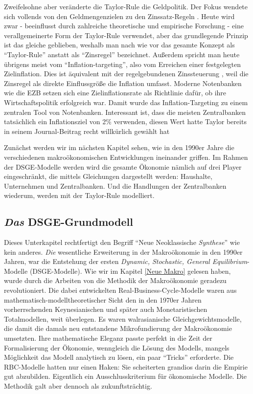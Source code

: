 Zweifelsohne aber veränderte die Taylor-Rule die Geldpolitik. Der Fokus wendete sich vollends von den Geldmengenzielen \parencite{Friedman1960} zu den Zinssatz-Regeln \parencite[S. 36]{Gali2007}. Heute wird zwar - beeinflusst durch zahlreiche theoretische \parencite{Woodford2001} und empirische \parencite{Gali2000, Taylor1999} Forschung - eine verallgemeinerte Form der Taylor-Rule verwendet, aber das grundlegende Prinzip ist das gleiche geblieben, weshalb man nach wie vor das gesamte Konzept als "`Taylor-Rule"' anstatt als "`Zinsregel"' bezeichnet. Außerdem spricht man heute übrigens meist vom "`Inflation-targeting"', also vom Erreichen einer festgelegten Zielinflation. Dies ist äquivalent mit der regelgebundenen Zinssteuerung \parencite{Taylor2006}, weil die Zinsregel als direkte Einflussgröße die Inflation umfasst. Moderne Notenbanken wie die EZB setzen sich eine Zielinflationsrate als Richtlinie dafür, ob ihre Wirtschaftspolitik erfolgreich war. Damit wurde das Inflation-Targeting zu einem zentralen Tool von Notenbanken. Interessant ist, dass die meisten Zentralbanken tatsächlich ein Inflationsziel von 2\% verwenden, diesen Wert hatte Taylor bereits in seinem Journal-Beitrag recht willkürlich gewählt hat \parencite[S. 202]{Taylor1993} 

Zunächst werden wir im nächsten Kapitel sehen, wie in den 1990er Jahre die verschiedenen makroökonomischen Entwicklungen ineinander griffen. Im Rahmen der DSGE-Modelle werden wird die gesamte Ökonomie nämlich auf drei Player eingeschränkt, die mittels Gleichungen dargestellt werden: Haushalte, Unternehmen und Zentralbanken. Und die Handlungen der Zentralbanken wiederum, werden mit der Taylor-Rule modelliert.

\subsection{\textit{Das} DSGE-Grundmodell}

Dieses Unterkapitel rechtfertigt den Begriff "`Neue Neoklassische \textit{Synthese}"' wie kein anderes. \textit{Die} wesentliche Erweiterung in der Makroökonomie in den 1990er Jahren, war die Entstehung der ersten \textit{Dynamic, Stochastic, General Equilibrium}-Modelle (DSGE-Modelle). Wie wir im Kapitel \ref{Neue Makro} gelesen haben, wurde durch die Arbeiten von \textcite{Kydland1982, Plosser1983} die Methodik der Makroökonomie geradezu revolutioniert. Die dabei entwickelten Real-Business-Cycle-Modelle waren aus mathematisch-modelltheoretischer Sicht den in den 1970er Jahren vorherrschenden Keynesianischen und später auch Monetaristischen Totalmodellen, weit überlegen. Es waren walrasianische Gleichgewichtsmodelle, die damit die damals neu entstandene Mikrofundierung der Makroökonomie umsetzten. Ihre mathematische Eleganz passte perfekt in die Zeit der Formalisierung der Ökonomie, wenngleich die Lösung des Modells, mangels Möglichkeit das Modell analytisch zu lösen, ein paar "`Tricks"' erforderte. Die RBC-Modelle hatten nur einen Haken: Sie scheiterten grandios darin die Empirie gut abzubilden. Eigentlich ein Ausschlusskriterium für ökonomische Modelle. Die Methodik galt aber dennoch als zukunftsträchtig. 

